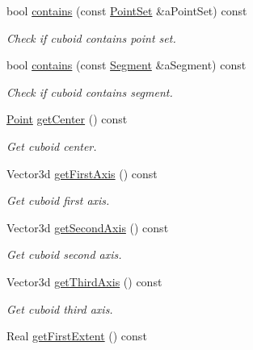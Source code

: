 \begin{DoxyCompactItemize}
bool \hyperlink{classostk_1_1math_1_1geom_1_1d3_1_1objects_1_1_cuboid_ac2f8d6ab7827fd2c8c088ef69492aa2c}{contains} (const \hyperlink{classostk_1_1math_1_1geom_1_1d3_1_1objects_1_1_point_set}{Point\+Set} \&a\+Point\+Set) const
\begin{DoxyCompactList}\small\item\em Check if cuboid contains point set. \end{DoxyCompactList}\item 
bool \hyperlink{classostk_1_1math_1_1geom_1_1d3_1_1objects_1_1_cuboid_ac04afa98ba39500f4e476a57a92a554e}{contains} (const \hyperlink{classostk_1_1math_1_1geom_1_1d3_1_1objects_1_1_segment}{Segment} \&a\+Segment) const
\begin{DoxyCompactList}\small\item\em Check if cuboid contains segment. \end{DoxyCompactList}\item 
\hyperlink{classostk_1_1math_1_1geom_1_1d3_1_1objects_1_1_point}{Point} \hyperlink{classostk_1_1math_1_1geom_1_1d3_1_1objects_1_1_cuboid_af55a54e1355ac6a50c1b9c6d0de1abd8}{get\+Center} () const
\begin{DoxyCompactList}\small\item\em Get cuboid center. \end{DoxyCompactList}\item 
Vector3d \hyperlink{classostk_1_1math_1_1geom_1_1d3_1_1objects_1_1_cuboid_a944ae7484ccd8c22cc6a814cb002aad8}{get\+First\+Axis} () const
\begin{DoxyCompactList}\small\item\em Get cuboid first axis. \end{DoxyCompactList}\item 
Vector3d \hyperlink{classostk_1_1math_1_1geom_1_1d3_1_1objects_1_1_cuboid_add00ad2c59ec4a2e64d655e9ad2810a8}{get\+Second\+Axis} () const
\begin{DoxyCompactList}\small\item\em Get cuboid second axis. \end{DoxyCompactList}\item 
Vector3d \hyperlink{classostk_1_1math_1_1geom_1_1d3_1_1objects_1_1_cuboid_ac60a1fcb4c3472283629b9cf9de45d12}{get\+Third\+Axis} () const
\begin{DoxyCompactList}\small\item\em Get cuboid third axis. \end{DoxyCompactList}\item 
Real \hyperlink{classostk_1_1math_1_1geom_1_1d3_1_1objects_1_1_cuboid_a5a86a357cd12deb1cf51c48ef8c3e406}{get\+First\+Extent} () const

\end{DoxyCompactItemize}
